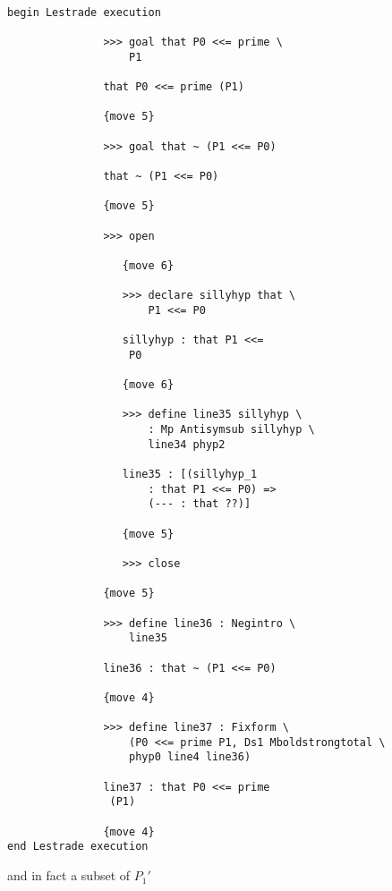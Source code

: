 \documentclass[12pt]{article}
\begin{document}
\begin{verbatim}

begin Lestrade execution

               >>> goal that P0 <<= prime \
                   P1

               that P0 <<= prime (P1)

               {move 5}

               >>> goal that ~ (P1 <<= P0)

               that ~ (P1 <<= P0)

               {move 5}

               >>> open

                  {move 6}

                  >>> declare sillyhyp that \
                      P1 <<= P0

                  sillyhyp : that P1 <<= 
                   P0

                  {move 6}

                  >>> define line35 sillyhyp \
                      : Mp Antisymsub sillyhyp \
                      line34 phyp2

                  line35 : [(sillyhyp_1 
                      : that P1 <<= P0) => 
                      (--- : that ??)]

                  {move 5}

                  >>> close

               {move 5}

               >>> define line36 : Negintro \
                   line35

               line36 : that ~ (P1 <<= P0)

               {move 4}

               >>> define line37 : Fixform \
                   (P0 <<= prime P1, Ds1 Mboldstrongtotal \
                   phyp0 line4 line36)

               line37 : that P0 <<= prime 
                (P1)

               {move 4}
end Lestrade execution
\end{verbatim}

and in fact a subset of $P_1'$
\end{document}
